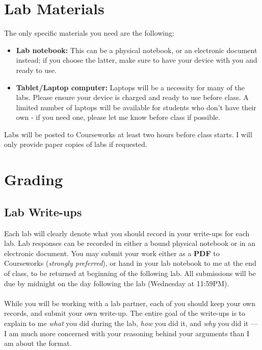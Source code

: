 \documentclass[11pt]{article}
\begin{document}
\section*{Lab Materials}
 
The only specific materials you need are the following:
 
\begin{itemize}
\item \textbf{Lab notebook:} This can be a physical notebook, or an electronic document instead; if you choose the latter, make sure to have your device with you and ready to use.

\item \textbf{Tablet/Laptop computer:} Laptops will be a necessity for many of the labs. Please ensure your device is charged and ready to use before class. A limited number of laptops will be available for students who don't have their own - if you need one, please let me know before class if possible. \\
\end{itemize}
\vspace{-12pt}
\noindent Labs will be posted to Courseworks at least two hours before class starts. I will only provide paper copies of labs if requested.
\section*{Grading}

\subsection*{Lab Write-ups}
Each lab will clearly denote what you should record in your write-ups for each lab. Lab responses can be recorded in either a bound physical notebook or in an electronic document. You may submit your work either as a \textbf{PDF} to Courseworks (\textit{strongly preferred}), or hand in your lab notebook to me at the end of class, to be returned at beginning of the following lab.  All submissions will be due by midnight on the day following the lab (Wednesday at 11:59PM). \\
\\
\noindent While you will be working with a lab partner, each of you should keep your own records, and submit your own write-up. The entire goal of the write-ups is to explain to me \textit{what} you did during the lab, \textit{how} you did it, and \textit{why} you did it --- I am much more concerned with your reasoning behind your arguments than I am about the format. \\
\end{document}
